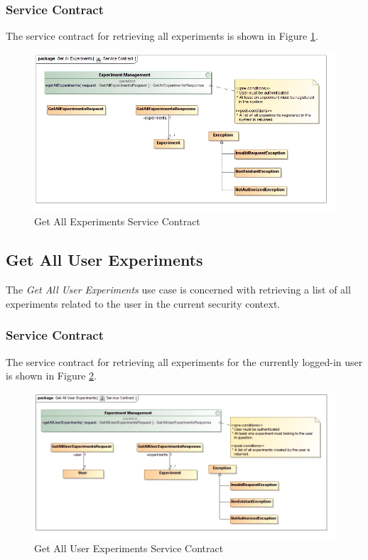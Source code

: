 \subsubsection{Service Contract}
The service contract for retrieving all experiments is shown in 
Figure \ref{fig:getAllExperimentsServiceContract}.
\begin{figure}[H]
  \begin{center}
  \includegraphics[scale=0.38]{../Diagrams and Charts/Experiment/Get All Experiments Service Contract.jpg}
  \caption{Get All Experiments Service Contract}
  \label{fig:getAllExperimentsServiceContract}
  \end{center}
\end{figure}



\subsection {Get All User Experiments}
The \textit{Get All User Experiments} use case is concerned with retrieving a
list of all experiments related to the user in the current security context.

\subsubsection{Service Contract}
The service contract for retrieving all experiments for the currently logged-in
user is shown in Figure \ref{fig:getAllUserExperimentsServiceContract}.
\begin{figure}[H]
  \begin{center}
  \includegraphics[scale=0.38]{../Diagrams and Charts/Experiment/Get All User Experiments Service Contract.jpg}
  \caption{Get All User Experiments Service Contract}
  \label{fig:getAllUserExperimentsServiceContract}
  \end{center}
\end{figure}

